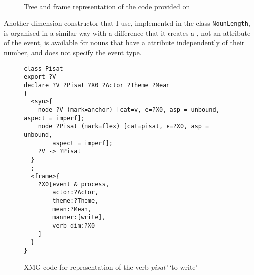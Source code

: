 \begin{figure}
\medskip\\
\caption{Tree and frame representation of the code provided on \label{card:tree:frame}}
\end{figure}

Another dimension constructor that I use, implemented in the class \texttt{NounLength},  is organised in a similar way with a difference that it creates a \NOUNDIM, not an \MDIM attribute of the event, is available for nouns that have a \LENGTH attribute independently of their number, and does not specify the event type.\pagebreak 


\begin{figure}
\begin{lstlisting}[style=xmg]
class Pisat
export ?V
declare ?V ?Pisat ?X0 ?Actor ?Theme ?Mean
{
  <syn>{
    node ?V (mark=anchor) [cat=v, e=?X0, asp = unbound, aspect = imperf];
    node ?Pisat (mark=flex) [cat=pisat, e=?X0, asp = unbound, 
    	aspect = imperf];
    ?V -> ?Pisat
  }
  ;
  <frame>{
    ?X0[event & process,
        actor:?Actor,
        theme:?Theme,
        mean:?Mean,
        manner:[write],
        verb-dim:?X0
    ]
  }
}
\end{lstlisting}
\caption{XMG code for representation of the verb \textit{pisat'} `to write' \label{xmg:pisat}}
\end{figure}

